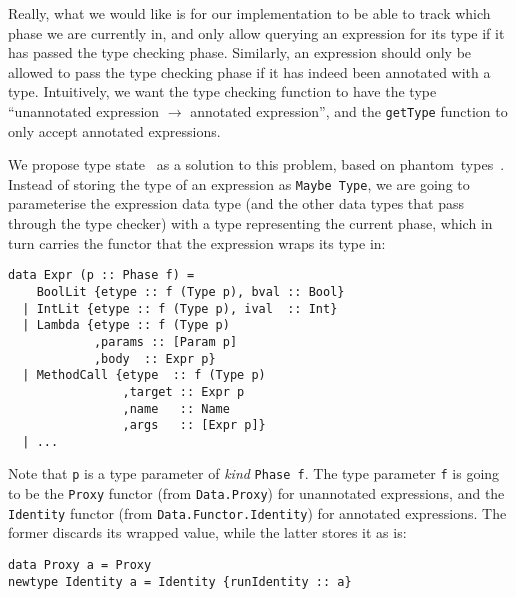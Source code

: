 \documentclass[sigplan,screen]{acmart}
\makeatletter
\newcommand{\ec}[1]{\lstinline[style=encore,breaklines=true,basicstyle=\fontsize{9}{9}\tt]@#1@}
\makeatother
\begin{document}
Really, what we would like is for our implementation to be able to
track which phase we are currently in, and only allow querying an
expression for its type if it has passed the type checking phase.
Similarly, an expression should only be allowed to pass the type
checking phase if it has indeed been annotated with a type.
Intuitively, we want the type checking function to have the type
``unannotated expression $\rightarrow$ annotated expression'', and
the \ec{getType} function to only accept annotated expressions.

We propose type state~\cite{typestate,typestateFoundation} as a solution to this problem, based on
phantom~types~\cite{phantom-types}. Instead of storing the type of
an expression as \ec{Maybe Type}, we are going to parameterise the
expression data type (and the other data types that pass through
the type checker) with a type representing the current phase,
which in turn carries the functor that the expression wraps its
type in:

\begin{minipage}[t]{.75\linewidth}
\begin{lstlisting}[style=encore]
data Expr (p :: Phase f) =
    BoolLit {etype :: f (Type p), bval :: Bool}
  | IntLit {etype :: f (Type p), ival  :: Int}
  | Lambda {etype :: f (Type p)
            ,params :: [Param p]
            ,body  :: Expr p}
  | MethodCall {etype  :: f (Type p)
                ,target :: Expr p
                ,name   :: Name
                ,args   :: [Expr p]}
  | ...
\end{lstlisting}
\end{minipage}

Note that \ec{p} is a type parameter of \emph{kind} \ec{Phase f}.
The type parameter \ec{f} is going to be the \ec{Proxy} functor
(from \ec{Data.Proxy}) for unannotated expressions, and the
\ec{Identity} functor (from \ec{Data.Functor.Identity}) for
annotated expressions. The former discards its wrapped value,
while the latter stores it as is:

\begin{minipage}[t]{.55\linewidth}
\begin{lstlisting}[style=encore]
data Proxy a = Proxy
newtype Identity a = Identity {runIdentity :: a}
\end{lstlisting}
\end{minipage}
\end{document}
